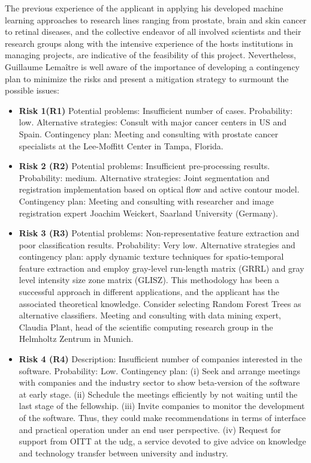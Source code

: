 The previous experience of the applicant in applying his developed machine learning approaches to research lines ranging from prostate, brain and skin cancer to retinal diseases, and the collective endeavor of all involved scientists and their research groups along with the intensive experience of the hosts institutions in managing projects, are indicative of the feasibility of this project. 
Nevertheless, Guillaume Lema\^itre is well aware of the importance of developing a contingency plan to minimize the risks and present a mitigation strategy to surmount the possible issues:
\begin{itemize}[noitemsep]
\item \textbf{Risk 1(R1)} Potential problems: Insufficient number of cases. Probability: low. Alternative strategies:  Consult with major cancer centers in US and Spain. Contingency plan: Meeting and consulting with prostate cancer specialists at the Lee-Moffitt Center in Tampa, Florida.
\item \textbf{Risk 2 (R2)} Potential problems: Insufficient pre-processing results. Probability: medium. Alternative strategies: Joint segmentation and registration implementation based on optical flow and active contour model. Contingency plan: Meeting and consulting with researcher and image registration expert Joachim Weickert, Saarland University (Germany).
\item \textbf{Risk 3 (R3)} Potential problems: Non-representative feature extraction and poor classification results. Probability: Very low. Alternative strategies and contingency plan: apply dynamic texture techniques for spatio-temporal feature extraction and employ gray-level run-length matrix (GRRL) and gray level intensity size zone matrix (GLISZ). 
This methodology has been a successful approach in different applications, and the applicant has the associated theoretical knowledge. 
Consider selecting Random Forest Trees as alternative classifiers. Meeting and consulting with data mining expert, Claudia Plant, head of the scientific computing research group in the Helmholtz Zentrum in Munich.
\item \textbf{Risk 4 (R4)} Description: Insufficient number of companies interested in the software. Probability: Low. Contingency plan: (i) Seek and arrange meetings with companies and the industry sector to show beta-version of the software at early stage. (ii) Schedule the meetings efficiently by not waiting until the last stage of the fellowship. (iii) Invite companies to monitor the development of the software. Thus, they could make recommendations in terms of interface and practical operation under an end user perspective. (iv) Request for support from OITT at the \ac{udg}, a service devoted to give advice on knowledge and technology transfer between university and industry.
\end{itemize}

